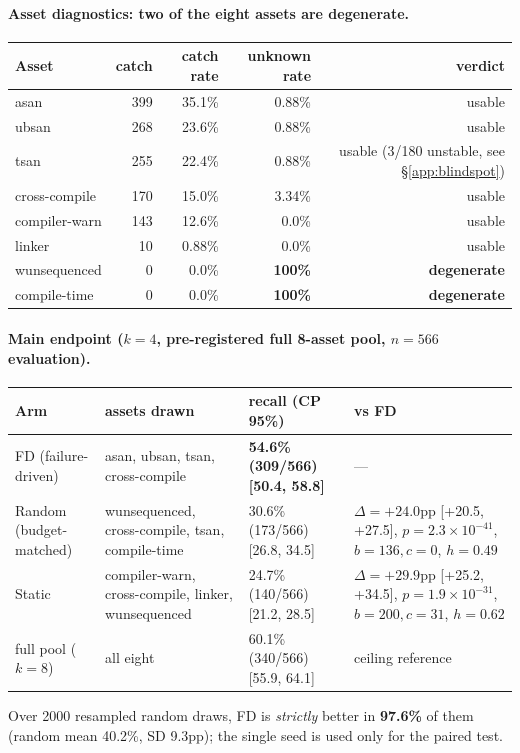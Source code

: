 \paragraph{Asset diagnostics: two of the eight assets are degenerate.}
\begin{center}\footnotesize
\begin{tabular}{@{}lrrrr@{}}
\toprule
Asset & catch & catch rate & unknown rate & verdict \\
\midrule
asan & 399 & 35.1\% & 0.88\% & usable \\
ubsan & 268 & 23.6\% & 0.88\% & usable \\
tsan & 255 & 22.4\% & 0.88\% & usable (3/180 unstable, see \S\ref{app:blindspot}) \\
cross-compile & 170 & 15.0\% & 3.34\% & usable \\
compiler-warn & 143 & 12.6\% & 0.0\% & usable \\
linker & 10 & 0.88\% & 0.0\% & usable \\
wunsequenced & 0 & 0.0\% & \textbf{100\%} & \textbf{degenerate} \\
compile-time & 0 & 0.0\% & \textbf{100\%} & \textbf{degenerate} \\
\bottomrule
\end{tabular}
\end{center}

\paragraph{Main endpoint ($k{=}4$, pre-registered full 8-asset pool, $n{=}566$ evaluation).}
\begin{center}\footnotesize
\begin{tabular}{@{}p{2.7cm}p{3.3cm}p{2.2cm}p{3.9cm}@{}}
\toprule
Arm & assets drawn & recall (CP 95\%) & vs FD \\
\midrule
FD (failure-driven) & asan, ubsan, tsan, cross-compile & \textbf{54.6\% (309/566) [50.4, 58.8]} & --- \\
Random (budget-matched) & wunsequenced, cross-compile, tsan, compile-time & 30.6\% (173/566) [26.8, 34.5] & $\Delta{=}\mathbf{+24.0}$pp [+20.5, +27.5], $p{=}2.3\times10^{-41}$, $b{=}136,c{=}0$, $h{=}0.49$ \\
Static & compiler-warn, cross-compile, linker, wunsequenced & 24.7\% (140/566) [21.2, 28.5] & $\Delta{=}\mathbf{+29.9}$pp [+25.2, +34.5], $p{=}1.9\times10^{-31}$, $b{=}200,c{=}31$, $h{=}0.62$ \\
full pool ($k{=}8$) & all eight & 60.1\% (340/566) [55.9, 64.1] & ceiling reference \\
\bottomrule
\end{tabular}
\end{center}
Over 2000 resampled random draws, FD is \emph{strictly} better in \textbf{97.6\%} of them
(random mean 40.2\%, SD 9.3pp); the single seed is used only for the paired test.

